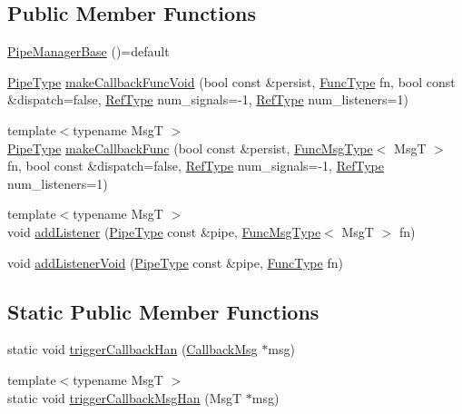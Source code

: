 \subsection*{Public Member Functions}
\begin{DoxyCompactItemize}
\item 
\hyperlink{structvt_1_1pipe_1_1_pipe_manager_base_a6b3b1e6d6bfe21308090d2dc62743961}{Pipe\+Manager\+Base} ()=default
\item 
\hyperlink{namespacevt_ac9852acda74d1896f48f406cd72c7bd3}{Pipe\+Type} \hyperlink{structvt_1_1pipe_1_1_pipe_manager_base_a20bf85e7494b5d018ed24b052f56fc28}{make\+Callback\+Func\+Void} (bool const \&persist, \hyperlink{structvt_1_1pipe_1_1_pipe_manager_base_a7ddc75a14fa50cd8521641ef6f9ea78d}{Func\+Type} fn, bool const \&dispatch=false, \hyperlink{namespacevt_a9b39ce9494bb04674d0d5b895a5aa50f}{Ref\+Type} num\+\_\+signals=-\/1, \hyperlink{namespacevt_a9b39ce9494bb04674d0d5b895a5aa50f}{Ref\+Type} num\+\_\+listeners=1)
\item 
{\footnotesize template$<$typename MsgT $>$ }\\\hyperlink{namespacevt_ac9852acda74d1896f48f406cd72c7bd3}{Pipe\+Type} \hyperlink{structvt_1_1pipe_1_1_pipe_manager_base_a7fbd6f5b88e5cca79f8588ea67ce6161}{make\+Callback\+Func} (bool const \&persist, \hyperlink{structvt_1_1pipe_1_1_pipe_manager_base_aa54eee64ab32a27777a672d49eb861f4}{Func\+Msg\+Type}$<$ MsgT $>$ fn, bool const \&dispatch=false, \hyperlink{namespacevt_a9b39ce9494bb04674d0d5b895a5aa50f}{Ref\+Type} num\+\_\+signals=-\/1, \hyperlink{namespacevt_a9b39ce9494bb04674d0d5b895a5aa50f}{Ref\+Type} num\+\_\+listeners=1)
\item 
{\footnotesize template$<$typename MsgT $>$ }\\void \hyperlink{structvt_1_1pipe_1_1_pipe_manager_base_aa878aef84540ec6c2ca89096683d407e}{add\+Listener} (\hyperlink{namespacevt_ac9852acda74d1896f48f406cd72c7bd3}{Pipe\+Type} const \&pipe, \hyperlink{structvt_1_1pipe_1_1_pipe_manager_base_aa54eee64ab32a27777a672d49eb861f4}{Func\+Msg\+Type}$<$ MsgT $>$ fn)
\item 
void \hyperlink{structvt_1_1pipe_1_1_pipe_manager_base_ae486f94f76733fd3d97ff393c35d0e5e}{add\+Listener\+Void} (\hyperlink{namespacevt_ac9852acda74d1896f48f406cd72c7bd3}{Pipe\+Type} const \&pipe, \hyperlink{structvt_1_1pipe_1_1_pipe_manager_base_a7ddc75a14fa50cd8521641ef6f9ea78d}{Func\+Type} fn)
\end{DoxyCompactItemize}
\subsection*{Static Public Member Functions}
\begin{DoxyCompactItemize}
\item 
static void \hyperlink{structvt_1_1pipe_1_1_pipe_manager_base_acae150f3cb2f27a84f39186ad4dd1a37}{trigger\+Callback\+Han} (\hyperlink{structvt_1_1pipe_1_1_callback_msg}{Callback\+Msg} $\ast$msg)
\item 
{\footnotesize template$<$typename MsgT $>$ }\\static void \hyperlink{structvt_1_1pipe_1_1_pipe_manager_base_a56855a2a2c55decbb79971f51fb9dcce}{trigger\+Callback\+Msg\+Han} (MsgT $\ast$msg)
\end{DoxyCompactItemize}

